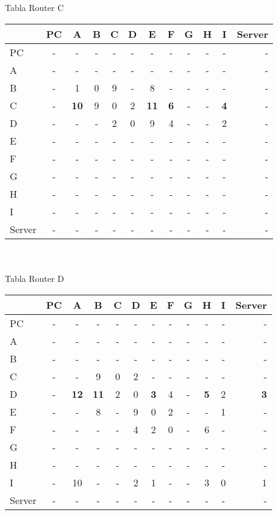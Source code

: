 \documentclass{article}
\begin{document}
\\
\\
Tabla Router C \\
\begin{tabular}{l*{10}{c}r}
              & PC & A & B & C & D & E & F & G & H & I & Server \\
\hline
PC             & - & - & - & - & - & - & - & - & - & - & -\\
A              & - & - & - & - & - & - & - & - & - & - & -\\
B              & - & 1 & 0 & 9 & - & 8 & - & - & - & - & -\\
C              & - &\bf{10}& 9 & 0 & 2 &\bf{11}&\bf{6}& - & - &\bf{4}& -\\
D              & - & - & - & 2 & 0 & 9 & 4 & - & - & 2 & -\\
E              & - & - & - & - & - & - & - & - & - & - & -\\
F              & - & - & - & - & - & - & - & - & - & - & -\\
G              & - & - & - & - & - & - & - & - & - & - & -\\
H              & - & - & - & - & - & - & - & - & - & - & -\\
I              & - & - & - & - & - & - & - & - & - & - & -\\
Server         & - & - & - & - & - & - & - & - & - & - & -\\
\end{tabular}
\\
\\
Tabla Router D	 \\
\begin{tabular}{l*{10}{c}r}
              & PC & A & B & C & D & E & F & G & H & I & Server \\
\hline
PC             & - & - & - & - & - & - & - & - & - & - & -\\
A              & - & - & - & - & - & - & - & - & - & - & -\\
B              & - & - & - & - & - & - & - & - & - & - & -\\
C              & - & - & 9 & 0 & 2 & - & - & - & - & - & -\\
D              & - &\bf{12}&\bf{11}& 2 & 0 &\bf{3}& 4 & - &\bf{5}& 2 &\bf{3}\\
E              & - & - & 8 & - & 9 & 0 & 2 & - & - & 1 & -\\
F              & - & - & - & - & 4 & 2 & 0 & - & 6 & - & -\\
G              & - & - & - & - & - & - & - & - & - & - & -\\
H              & - & - & - & - & - & - & - & - & - & - & -\\
I              & - & 10 & - & - & 2 & 1 & - & - & 3 & 0 & 1\\
Server         & - & - & - & - & - & - & - & - & - & - & -\\

\end{tabular}\\
\end{document}
